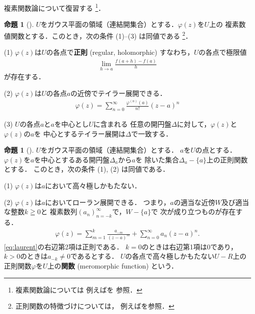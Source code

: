 \documentclass[11pt, a4paper, dvipdfmx, draft]{jsarticle}
\theoremstyle{definition}
\newtheorem{Proposition}[Axiom]{命題}
\newcommand{\pphi}{\varphi} %
\theoremstyle{mystyle}
\numberwithin{equation}{section} %
\begin{document}
複素関数論について復習する
\footnote{
    複素関数論については
    例えば\cite{jimbo,yoshida,kaneko,fuji}を
    参照．
}．


\begin{Proposition}[{\cite[定義--命題1.5]{ogs}}]
    $U$をガウス平面の領域（連結開集合）とする．$\pphi(z)$を$U$上の
    複素数値関数とする．このとき，次の条件 (1)--(3) は同値である
    \footnote{
        正則関数の特徴づけについては，
        例えば\cite[4.3節]{kaneko}を参照．
    }．

    (1) 
    $\pphi(z)$は$U$の各点で\textbf{正則} (regular, holomorphic) すなわち，$U$の各点で極限値\begin{align*}
        \lim_{h\to a}\frac{f(a+h)-f(a)}{h}
    \end{align*}が存在する．

    (2) 
    $\pphi(z)$は$U$の各点$a$の近傍でテイラー展開できる．
    \begin{align*}
        \pphi(z)=\sum_{n=0}^{\infty}\frac{\pphi^{(n)}(a)}{n!}(z-a)^{n}
    \end{align*}

    (3) 
    $U$の各点$a$と$a$を中心とし$U$に含まれる
    任意の開円盤$\Delta$に対して，$\pphi(z)$と$\pphi(z)$の$a$を
    中心とするテイラー展開は$\Delta$で一致する．
\end{Proposition}

\begin{Proposition}[{\cite[定義--命題1.6]{ogs}}]
    $U$をガウス平面の領域（連結開集合）とする．
    $a$を$U$の点とする．
    $\pphi(z)$を$a$を中心とするある開円盤$\Delta_a$から$a$を
    除いた集合$\Delta_a-\{a\}$上の正則関数とする．
    このとき，次の条件 (1), (2) は同値である．

    (1) 
    $\pphi(z)$は$a$において高々極しかもたない．

    (2) 
    $\pphi(z)$は$a$においてローラン展開できる．
    つまり，$a$の適当な近傍$W$及び適当な整数$k\geqq0$と
    複素数列$(a_n)_{n=-k}^{\infty}$で，$W-\{a\}$で
    次が成り立つものが存在する．
    \begin{align}
        \pphi(z)=\sum_{m=1}^{k}\frac{a_{-m}}{(z-a)^{m}}
        +\sum_{n=0}^{\infty}a_n(z-a)^{n}. \label{eq:laurent}
    \end{align}
    \eqref{eq:laurent}の右辺第2項は正則である．
    $k=0$のときは右辺第1項は$0$であり，
    $k>0$のときは$a_{-k}\ne0$であるとする．
    $U$の各点で高々極しかもたない$U-R$上の
    正則関数$\pphi$を$U$上の\textbf{関数} (meromorphic function) という．
\end{Proposition}
\end{document}
